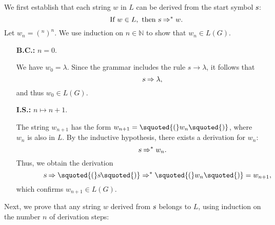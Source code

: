 \proofEng
We first establish that each string \( w \) in \( L \) can be derived from the start symbol \( \textsl{s} \):
\[
\hspace*{1.3cm}
\text{If } w \in L, \text{ then } \textsl{s} \Rightarrow^* w.
\]
Let \( w_n = (^n)^n \). We use induction on \( n \in \mathbb{N} \) to show that \( w_n \in L(G) \).
\begin{enumerate}
\item[\textbf{B.C.:}] \( n=0 \).

            We have \( w_0 = \lambda \). Since the grammar includes the rule \( s \rightarrow \lambda \), it follows that
            \[
            \hspace*{1.3cm}
            \textsl{s} \Rightarrow \lambda,
            \]
            and thus \( w_0 \in L(G) \).

\item[\textbf{I.S.:}] \( n \mapsto n + 1 \).

            The string \( w_{n+1} \) has the form \( w_{n+1} = \squoted{(}w_n\squoted{)} \), where \( w_n \) is also in \( L \).
            By the inductive hypothesis, there exists a derivation for \( w_n \):
            \[
            \hspace*{1.3cm}
            \textsl{s} \Rightarrow^* w_n.
            \]
            Thus, we obtain the derivation
            \[
            \hspace*{1.3cm}
            \textsl{s} \Rightarrow \squoted{(}\textsl{s}\squoted{)} \Rightarrow^* \squoted{(} w_n \squoted{)} = w_{n+1},
            \]
            which confirms \( w_{n+1} \in L(G) \).
\end{enumerate}
Next, we prove that any string \( w \) derived from \( \textsl{s} \) belongs to \( L \), using induction on the number \( n \) of derivation steps:
